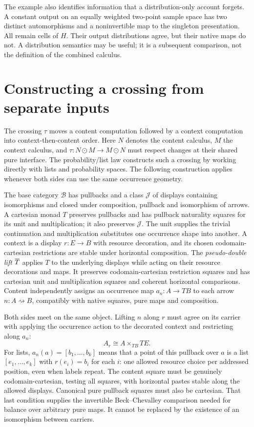 \documentclass[11pt]{article}
\numberwithin{equation}{section}
\theoremstyle{definition}\newtheorem{definition}[theorem]{Definition}
\newcommand{\B}{\mathcal B}\newcommand{\J}{\mathcal J}
\begin{document}
The example also identifies information that a distribution-only account
forgets. A constant output on an equally weighted two-point sample space
has two distinct automorphisms and a noninvertible map to the singleton
presentation. All remain cells of $H$. Their output distributions agree,
but their native maps do not. A distribution semantics may be useful; it
is a subsequent comparison, not the definition of the combined calculus.

\section{Constructing a crossing from separate inputs}\label{sec:independent-main}
The crossing $\tau$ moves a content computation followed by a context
computation into context-then-content order. Here $N$ denotes the content
calculus, $M$ the context calculus, and $\tau:N\odot M\to M\odot N$ must
respect changes at their shared pure interface. The probability/list law
constructs such a crossing by working directly with lists and probability
spaces. The following construction applies whenever both sides can use the
same occurrence geometry.

The base category $\B$ has pullbacks and a class $\J$ of displays containing
isomorphisms and closed under composition, pullback and isomorphism of
arrows. A cartesian monad
$T$ preserves pullbacks and has pullback naturality squares for its unit
and multiplication; it also preserves $\J$. The unit supplies the trivial
continuation and multiplication substitutes one occurrence shape into
another. A context is a display $r:E\to B$ with resource decoration, and
its chosen codomain-cartesian restrictions are stable under horizontal
composition. The \emph{pseudo-double lift} $\overline T$ applies $T$ to the
underlying displays while acting on their resource decorations and maps.
It preserves codomain-cartesian restriction squares and has cartesian unit and
multiplication squares and coherent horizontal comparisons. Content
independently assigns an occurrence map $a_n:A\to TB$ to each arrow
$n:A\rightsquigarrow B$, compatibly with native squares, pure maps and
composition.

Both sides meet on the same object. Lifting $n$ along $r$ must agree on its
carrier with applying the occurrence action to the decorated context and
restricting along $a_n$:
\begin{equation}\label{eq:common-carrier-main}
                     A_r\cong A\times_{TB}TE.
\end{equation}
For lists, $a_n(a)=[b_1,\ldots,b_k]$ means that a point of this pullback over
$a$ is a list $[e_1,\ldots,e_k]$ with $r(e_i)=b_i$ for each $i$: one
allowed resource choice per addressed position, even when labels repeat.
The content square must be genuinely codomain-cartesian, testing all
squares, with horizontal pastes stable along the allowed displays.
Canonical pure pullback squares must also be cartesian. That last
condition supplies the invertible Beck--Chevalley comparison needed for
balance over arbitrary pure maps. It cannot be replaced by the existence
of an isomorphism between carriers.
\end{document}
